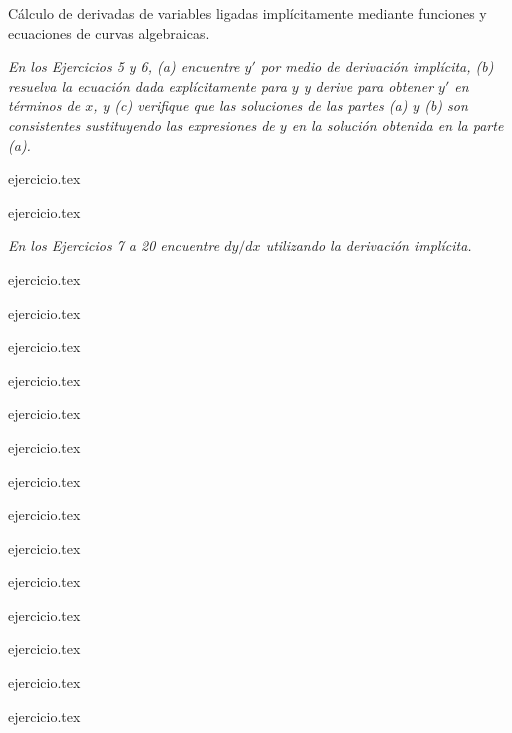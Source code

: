 
Cálculo de derivadas de variables ligadas implícitamente mediante funciones y ecuaciones de curvas algebraicas.

\noindent \textit{En los Ejercicios 5 y 6, (a) encuentre $y'$ por medio de derivación implícita, (b) resuelva la ecuación dada explícitamente para $y$ y derive para obtener $y'$ en términos de $x$, y (c) verifique que las soluciones de las partes (a) y (b) son consistentes sustituyendo las expresiones de $y$ en la solución obtenida en la parte (a).}

\begin{enumerate}
    \begin{minipage}{0.45\textwidth}
    {ejercicio.tex}
    \end{minipage}%
    \begin{minipage}{0.45\textwidth}
    \setcounter{enumi}{5}
    {ejercicio.tex}
    \end{minipage}
\end{enumerate}

\noindent \textit{En los Ejercicios 7 a 20 encuentre $dy/dx$ utilizando la derivación implícita.}

\begin{enumerate}
    \begin{minipage}{0.45\textwidth}
    \setcounter{enumi}{6}
    {ejercicio.tex}
    \addtocounter{enumi}{1}
    {ejercicio.tex}
    \addtocounter{enumi}{1}
    {ejercicio.tex}
    \addtocounter{enumi}{1}
    {ejercicio.tex}
    \addtocounter{enumi}{1}
    {ejercicio.tex}
    \addtocounter{enumi}{1}
    {ejercicio.tex}
    \addtocounter{enumi}{1}
    {ejercicio.tex}
    \end{minipage}%
    \begin{minipage}{0.45\textwidth}
    \setcounter{enumi}{7}
    {ejercicio.tex}
    \addtocounter{enumi}{1}
    {ejercicio.tex}
    \addtocounter{enumi}{1}
    {ejercicio.tex}
    \addtocounter{enumi}{1}
    {ejercicio.tex}
    \addtocounter{enumi}{1}
    {ejercicio.tex}
    \addtocounter{enumi}{1}
    {ejercicio.tex}
    \addtocounter{enumi}{1}
    {ejercicio.tex}
    \end{minipage}
\end{enumerate}


